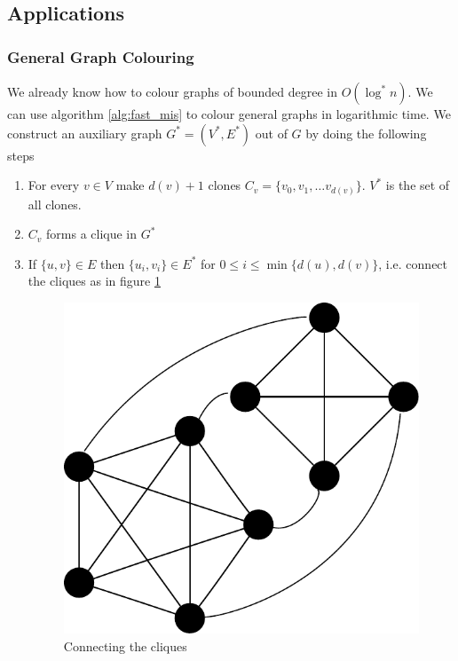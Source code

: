 \subsection{Applications}

\subsubsection{General Graph Colouring}

We already know how to colour graphs of bounded degree in $O(\log^* n)$. We can use algorithm \ref{alg:fast_mis} to colour general graphs in logarithmic time. We construct an auxiliary graph $G^* = (V^*, E^*)$ out of $G$ by doing the following steps

\begin{enumerate}
\item For every $v\in V$ make $d(v)+1$ clones $C_v = \{v_0,v_1,\ldots v_{d(v)}\}$. $V^*$ is the set of all clones.
\item $C_v$ forms a clique in $G^*$
\item If $\{u,v\} \in E$ then $\{u_i,v_i\} \in E^*$ for $0\leq i \leq \min \{d(u),d(v)\}$, i.e. connect the cliques as in figure \ref{fig:colour_via_matching}

\begin{figure}
\begin{center}
\includegraphics[scale=0.7]{./images/colour_via_matching}
%
%		
%	
%	
\end{center}
\caption{Connecting the cliques}
\label{fig:colour_via_matching}
\end{figure}
\end{enumerate}

